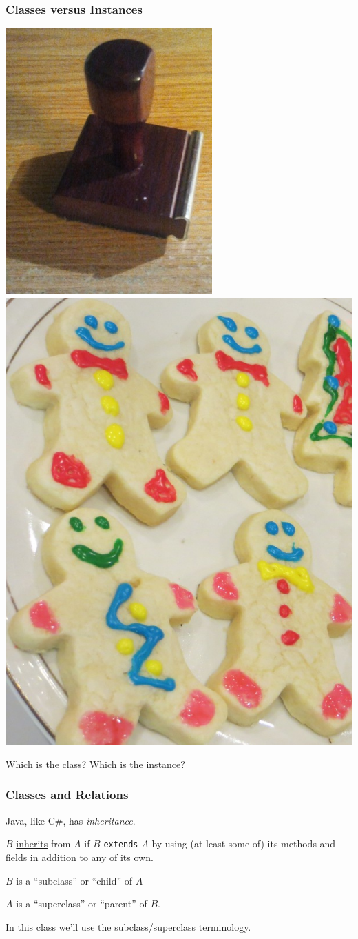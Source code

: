 \begin{frame}
\frametitle{Classes versus Instances}

\includegraphics[width=.45\textwidth]{images/peo-stamp-small.jpg}
\includegraphics[width=.45\textwidth]{images/1502_cookies.jpg}

\begin{center}
Which is the class? Which is the instance?
\end{center}

\end{frame}

\begin{frame}
\frametitle{Classes and Relations}
\begin{changemargin}{1cm}
Java, like C\#, has \textit{inheritance}.

$B$ \underline{inherits} from $A$ if $B$ \texttt{extends} $A$ by using (at least some of) its methods and fields in addition to any of its own.

$B$ is a ``subclass'' or ``child'' of $A$

$A$ is a ``superclass'' or ``parent'' of $B$.

In this class we'll use the subclass/superclass terminology.
\end{changemargin}
\end{frame}

